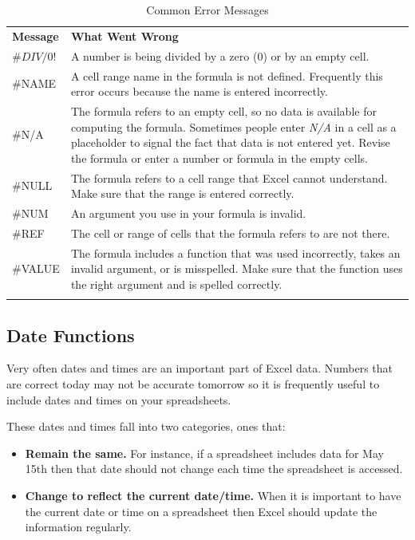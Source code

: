 {\small
	\begin{longtable}{p{0.75in}p{3.50in}} %
		\textbf{Message} & \textbf{What Went Wrong} \endhead
		\hline \\
		$ \#DIV/0! $ & A number is being divided by a zero ($ 0 $) or by an empty cell.\\
		\#NAME & A cell range name in the formula is not defined. Frequently this error occurs because the name is entered incorrectly.\\
		\#N/A & The formula refers to an empty cell, so no data is available for computing the formula. Sometimes people enter \textit{N/A} in a cell as a placeholder to signal the fact that data is not entered yet. Revise the formula or enter a number or formula in the empty cells.\\
		\#NULL & The formula refers to a cell range that Excel cannot understand. Make sure that the range is entered correctly.\\
		\#NUM & An argument you use in your formula is invalid.\\
		\#REF & The cell or range of cells that the formula refers to are not there.\\
		\#VALUE & The formula includes a function that was used incorrectly, takes an invalid argument, or is misspelled. Make sure that the function uses the right argument and is spelled correctly.\\
		\caption{Common Error Messages}
		\label{03:tab01}
	\end{longtable}
}

\subsection{Date Functions}

Very often dates and times are an important part of Excel data. Numbers that are correct today may not be accurate tomorrow so it is frequently useful to include dates and times on your spreadsheets.

These dates and times fall into two categories, ones that:

\begin{itemize}
	\item \textbf{Remain the same.} For instance, if a spreadsheet includes data for May 15th then that date should not change each time the spreadsheet is accessed.
	\item \textbf{Change to reflect the current date/time.} When it is important to have the current date or time on a spreadsheet then Excel should update the information regularly.
\end{itemize}

